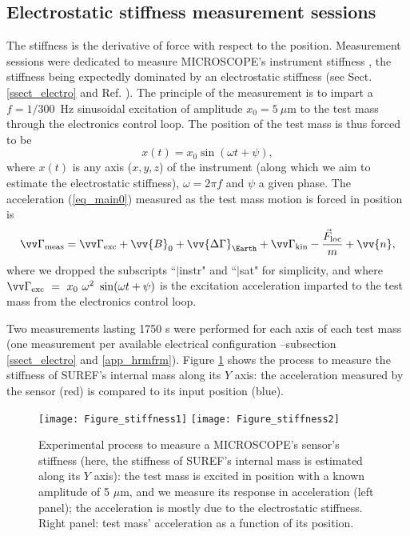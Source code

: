 \documentclass[12pt]{iopart}
\begin{document}
\subsection{Electrostatic stiffness measurement sessions} \label{ssect_measurement}

The stiffness is the derivative of force with respect to the position.
Measurement sessions were dedicated to measure MICROSCOPE's instrument stiffness \cite{chhuncqg5}, the stiffness being expectedly dominated by an electrostatic stiffness (see Sect. \ref{ssect_electro} and Ref. \cite{liorzou20}). 
The principle of the measurement is to impart a $f=1/300$~Hz sinusoidal excitation of amplitude $x_0=5~\mu$m to the test mass through the electronics control loop.
The position of the test mass is thus forced to be
\begin{equation}
x(t) = x_0 \sin(\omega t + \psi),
\end{equation}
where $x(t)$ is any axis ($x,y,z$) of the instrument (along which we aim to estimate the electrostatic stiffness), $\omega = 2\pi f$ and $\psi$ a given phase.
The acceleration (\ref{eq_main0}) measured as the test mass motion is forced in position is 
\begin{equation} 
\vv\Gamma_{\rm meas} = \vv\Gamma_{\rm exc} + \vv{B}_{0} + \vv{\Delta\Gamma}_\Earth + \vv\Gamma_{\rm kin} - \frac{\vec{F}_{\rm loc}}{m} + \vv{n},
\end{equation}
where we dropped the subscripts ``$|$instr" and ``$|$sat" for simplicity, and where $\vv\Gamma_{\rm exc}~=~x_0~ \omega^2 ~\sin(\omega t + \psi)$ is the excitation acceleration imparted to the test mass from the electronics control loop.

Two measurements lasting 1750 s were performed for each axis of each test mass (one measurement per available electrical configuration --subsection \ref{ssect_electro} and \ref{app_hrmfrm}).
Figure \ref{fig_meas} shows the process to measure the stiffness of SUREF's internal mass along its $Y$ axis: the acceleration measured by the sensor (red) is compared to its input position (blue).

\begin{figure}%
\begin{center}
\texttt{[image: Figure\_stiffness1]}
\texttt{[image: Figure\_stiffness2]}
\caption{Experimental process to measure a MICROSCOPE's sensor's stiffness (here, the stiffness of SUREF's internal mass is estimated along its $Y$ axis): the test mass is excited in position with a known amplitude of 5 $\mu$m, and we measure its response in acceleration (left panel); the acceleration is mostly due to the electrostatic stiffness. Right panel: test mass' acceleration as a function of its position.}
\label{fig_meas}
\end{center}
\end{figure}
\end{document}

